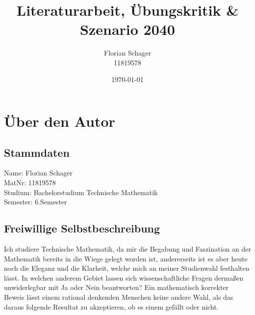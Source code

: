 \documentclass[twoside, a4paper, DIV=11, open=any, bibliography=totoc]{scrbook}
\begin{document}
\begin{titlepage}
    \subject{LVA: "`Technik für Menschen 2040"'}
    \title{Literaturarbeit, Übungskritik \& Szenario 2040}
    \author{
        Florian Schager\\
        \small 11819578
    }
    \date{\today}
    \titlehead{Sommersemester 2021}
\end{titlepage}
\maketitle



\tableofcontents


\chapter{Über den Autor} \label{chap:Autor}

\section{Stammdaten} \label{sec:stammdaten}

Name: Florian Schager\\
MatNr: 11819578\\
Studium: Bachelorstudium Technische Mathematik \\
Semester: 6.Semester \\

\section{Freiwillige Selbstbeschreibung} \label{sec:selbstbeschreibung}


Ich studiere Technische Mathematik, da mir die Begabung und Faszination an der Mathematik bereits in die Wiege gelegt worden ist,
andererseits ist es aber heute noch die Eleganz und die Klarheit, welche mich an meiner Studienwahl festhalten lässt.
In welchen anderem Gebiet lassen sich wissenschaftliche Fragen dermaßen unwiderlegbar mit Ja oder Nein beantworten?
Ein mathematisch korrekter Beweis lässt einem rational denkenden Menschen keine andere Wahl,
als das daraus folgende Resultat zu akzeptieren, ob es einem gefällt oder nicht.
\end{document}
